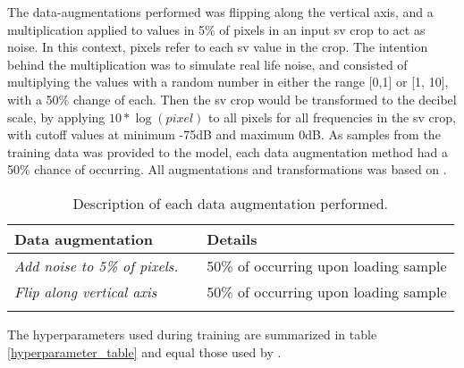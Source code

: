         The data-augmentations performed was flipping along the vertical axis, and a multiplication applied to values in 5\% of pixels in an input \gls{sv} crop to act as noise. In this context, pixels refer to each \gls{sv} value in the crop. The intention behind the multiplication was to simulate real life noise, and consisted of multiplying the values with a random number in either the range [0,1] or [1, 10], with a 50\% change of each. Then the \gls{sv} crop would be transformed to the decibel scale, by applying $10*\log{(pixel)}$ to all pixels for all frequencies in the \gls{sv} crop, with cutoff values at minimum -75dB and maximum 0dB. As samples from the training data was provided to the model, each data augmentation method had a 50\% chance of occurring. All augmentations and transformations was based on \citeauthor{brautaset2020acoustic}\cite{brautaset2020acoustic}. 

        
        \begin{longtable}{lll}

            \caption[Data augmentation summary]{Description of each data augmentation performed.}
            \\\hline
            \multicolumn{2}{|l|}{\textbf{Data augmentation}} & \multicolumn{1}{l|}{\textbf{Details}} \\ \hline
            \endfirsthead
            \endhead
            \textit{Add noise to 5\% of pixels.}      &       & 50\% of occurring upon loading sample \\ \hline
            \textit{Flip along vertical axis}        &       & 50\% of occurring upon loading sample \\ \hline

            \label{data_augmentation_table}
        \end{longtable}
        
        The hyperparameters used during training are summarized in table \ref{hyperparameter_table} and equal those used by \citeauthor{brautaset2020acoustic}\cite{brautaset2020acoustic}.

